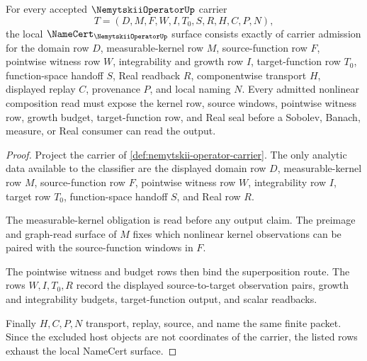 \begin{theorem}
\label{thm:nemytskii-operator-namecert-obligations}
For every accepted $\NemytskiiOperatorUp$ carrier
$$
T=(D,M,F,W,I,T_0,S,R,H,C,P,N),
$$
the local $\NameCert_{\NemytskiiOperatorUp}$ surface consists exactly of carrier admission for the domain row $D$, measurable-kernel row $M$, source-function row $F$, pointwise witness row $W$, integrability and growth row $I$, target-function row $T_0$, function-space handoff $S$, Real readback $R$, componentwise transport $H$, displayed replay $C$, provenance $P$, and local naming $N$. Every admitted nonlinear composition read must expose the kernel row, source windows, pointwise witness row, growth budget, target-function row, and Real seal before a Sobolev, Banach, measure, or Real consumer can read the output.
\end{theorem}
\begin{proof}
Project the carrier of \autoref{def:nemytskii-operator-carrier}. The only analytic data available to the classifier are the displayed domain row $D$, measurable-kernel row $M$, source-function row $F$, pointwise witness row $W$, integrability row $I$, target row $T_0$, function-space handoff $S$, and Real row $R$.

The measurable-kernel obligation is read before any output claim. The preimage and graph-read surface of $M$ fixes which nonlinear kernel observations can be paired with the source-function windows in $F$.

The pointwise witness and budget rows then bind the superposition route. The rows $W,I,T_0,R$ record the displayed source-to-target observation pairs, growth and integrability budgets, target-function output, and scalar readbacks.

Finally $H,C,P,N$ transport, replay, source, and name the same finite packet. Since the excluded host objects are not coordinates of the carrier, the listed rows exhaust the local NameCert surface.
\end{proof}

